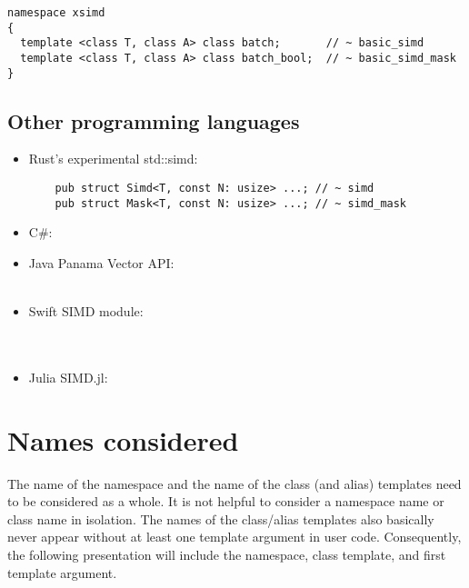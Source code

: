 \medskip\begin{lstlisting}
namespace xsimd
{
  template <class T, class A> class batch;       // ~ basic_simd
  template <class T, class A> class batch_bool;  // ~ basic_simd_mask
}
\end{lstlisting}

\subsection{Other programming languages}

\begin{itemize}
  \item Rust's experimental std::simd:
    \medskip\begin{lstlisting}
    pub struct Simd<T, const N: usize> ...; // ~ simd
    pub struct Mask<T, const N: usize> ...; // ~ simd_mask
    \end{lstlisting}

  \item C\#: 

  \item Java Panama Vector API:\\
    \\

  \item Swift SIMD module:\\
    \\
    \\

  \item Julia SIMD.jl: 

\end{itemize}




\section{Names considered}

The name of the namespace and the name of the class (and alias) templates need to be considered as a
whole.
It is not helpful to consider a namespace name or class name in isolation.
The names of the class/alias templates also basically never appear without at least one template
argument in user code.
Consequently, the following presentation will include the namespace, class template, and first
template argument.

